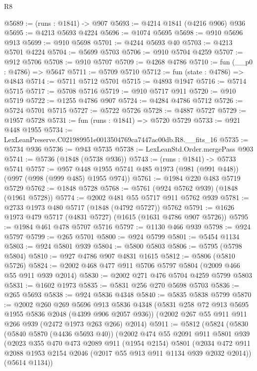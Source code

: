 \begin{lexlean}{R8}
\begin{coremodule}
@5689 := (runs : @1841) -> @907
@5693 := @4214 @1841 (@4216 @906) @936
@5695 := @4213 @5693 @4224
@5696 := @1074 @5695
@5698 := @910 @5696 @913
@5699 := @910 @5698
@5701 := @4244 @5693 @40
@5703 := @4213 @5701 @4224
@5704 := @5699 @5703
@5706 := @910 @5704 @4259
@5707 := @912 @5706
@5708 := @910 @5707
@5709 := @4268 @4786
@5710 := fun (__p0 : @4786) => @5647
@5711 := @5709 @5710
@5712 := fun (state : @4786) => @4843
@5714 := @5711 @5712 @5701
@5715 := @4893 @1947
@5716 := @5714 @5715
@5717 := @5708 @5716
@5719 := @910 @5717 @911
@5720 := @910 @5719
@5722 := @1255 @4786 @907
@5724 := @4284 @4786 @5712
@5726 := @5724 @5701 @5715
@5727 := @5722 @5726
@5728 := @4887 @5727
@5729 := @1957 @5728
@5731 := fun (runs : @1841) => @5720 @5729
@5733 := @921 @448 @1955
@5734 := LexLeanPreserve.C021989951e0013504769ca7447ac00db.R8.__fits_16
@5735 := @5734 @936
@5736 := @943 @5735
@5738 := LexLeanStd.Order.mergePass @903
@5741 := @5736 (@1848 (@5738 @936))
@5743 := (runs : @1841) -> @5733 @5741
@5757 := @957 @448 @1955 @5741 @485 @1973 (@981 (@991 @448)) (@997 (@998 (@999 @485) @1955 @974))
@5761 := @1984 @220 @483 @5719 @5729
@5762 := @1848 @5728
@5768 := @5761 (@924 @5762 @939) (@1848 (@1961 @5728))
@5774 := @2002 @481 @55 @5717 @911 @5762 @939
@5781 := @2733 @1973 @480 @5717 (@1848 (@4792 @5727)) @5762
@5791 := @1626 @1973 @479 @5717 (@4831 @5727) (@1615 (@1631 @4786 @907 @5726))
@5795 := @1984 @461 @478 @5707 @5716
@5797 := @1130 @466 @939
@5798 := @924 @5797
@5799 := @265 @5701
@5800 := @924 @5799
@5801 := @5454 @1134
@5803 := @924 @5801 @939
@5804 := @5800 @5803
@5806 := @5795 (@5798 @5804)
@5810 := @927 @4786 @907 @4831 @1615
@5812 := @5806 (@5810 @5726)
@5824 := @2002 @468 @477 @911 @5706 @5797 @5804 (@2009 @466 @55 @911 @939 @2014)
@5830 := @2002 @271 @476 @5704 @4259 @5799 @5803
@5831 := @1602 @1973
@5835 := @5831 @256 @270 @5698 @5703
@5836 := @265 @5693
@5838 := @924 @5836 @4348
@5840 := @5835 @5838 @5799
@5870 := @2002
    @260
    @269
    @5696
    @913
    @5836
    @4348
    (@5831 @258 @72 @913 @5695 @1955 @5836 @2048 (@4399 @906 @2057 @936))
    (@2002 @267 @55 @911 @911 @266 @939 (@2472 @1973 @263 @266) @2014)
@5911 := @5812
    (@5824
      (@5830
        (@5840 @5870 (@4436 @5693 @40))
        (@2002
          @474
          @55
          @2091
          @911
          @5801
          @939
          (@2023
            @355
            @470
            @473
            @2089
            @911
            (@1954 @2154)
            @5801
            (@2034 @472 @911 @2088 @1953 @2154 @2046 (@2017 @55 @913 @911 @1134 @939 @2032 @2014))
            (@5614 @1134))

\end{coremodule}
\end{lexlean}
